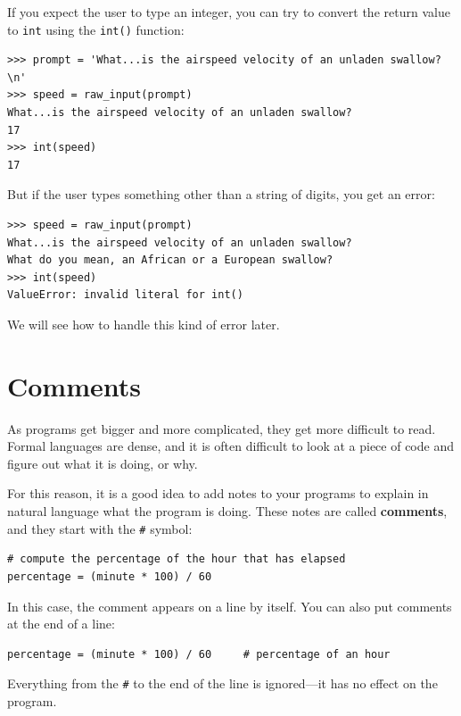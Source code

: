 \documentclass[10pt]{book}
\begin{document}

If you expect the user to type an integer, you can try to convert
the return value to {\tt int} using the {\tt int()} function:

\beforeverb
\begin{verbatim}
>>> prompt = 'What...is the airspeed velocity of an unladen swallow?\n'
>>> speed = raw_input(prompt)
What...is the airspeed velocity of an unladen swallow?
17
>>> int(speed)
17
\end{verbatim}
\afterverb
%
But if the user types something other than a string of digits,
you get an error:

\beforeverb
\begin{verbatim}
>>> speed = raw_input(prompt)
What...is the airspeed velocity of an unladen swallow?
What do you mean, an African or a European swallow?
>>> int(speed)
ValueError: invalid literal for int()
\end{verbatim}
\afterverb
%
We will see how to handle this kind of error later.



\section{Comments}

As programs get bigger and more complicated, they get more difficult
to read.  Formal languages are dense, and it is often difficult to
look at a piece of code and figure out what it is doing, or why.

For this reason, it is a good idea to add notes to your programs to explain
in natural language what the program is doing.  These notes are called
{\bf comments}, and they start with the \verb"#" symbol:

\beforeverb
\begin{verbatim}
# compute the percentage of the hour that has elapsed
percentage = (minute * 100) / 60
\end{verbatim}
\afterverb
%
In this case, the comment appears on a line by itself.  You can also put
comments at the end of a line:

\beforeverb
\begin{verbatim}
percentage = (minute * 100) / 60     # percentage of an hour
\end{verbatim}
\afterverb
%
Everything from the {\tt \#} to the end of the line is ignored---it
has no effect on the program.
\end{document}
